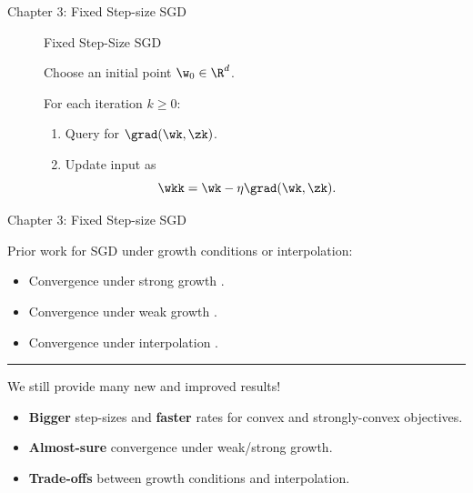 \documentclass[mathserif,notheorems, hyperref={colorlinks, citecolor=blue, urlcolor=blue, linkcolor=blue}]{beamer}
\begin{document}
    \begin{frame}{Chapter 3: Fixed Step-size SGD}
       
        \begin{figure}[t]
        \begin{procedure}{Fixed Step-Size SGD}
        \item Choose an initial point \( \w_0 \in \R^d \).
            \vspace{2ex}
        \item For each iteration \( k \geq 0 \):
            \begin{enumerate}
                \item Query \oracle{} for \( \grad(\wk, \zk) \).
                    \vspace{1ex}
                \item Update input as\vspace{-1ex}%
                    \[ \wkk = \wk - \eta \grad(\wk, \zk). \]
            \end{enumerate}
        \end{procedure}
        \end{figure}


    \end{frame}

    \begin{frame}{Chapter 3: Fixed Step-size SGD}
        
        Prior work for SGD under growth conditions or interpolation: 
        \begin{itemize}
            \item Convergence under strong growth \citep{schmidt2013fast, cevher2018linear}.
            \item Convergence under weak growth \citep{vaswani2019fast}.
            \item Convergence under interpolation \citep{bassily2018exponential}. 
        \end{itemize}
        \vspace{2ex}

       \pause
       \rule{\textwidth}{0.5px}
       \vspace{1ex}

       We still provide many new and improved results! 
       \begin{itemize}
           \item \textbf{Bigger} step-sizes and \textbf{faster} rates for convex and strongly-convex objectives. 
           \item \textbf{Almost-sure} convergence under weak/strong growth. 
           \item \textbf{Trade-offs} between growth conditions and interpolation. 
       \end{itemize}
    \end{frame}
\end{document}

